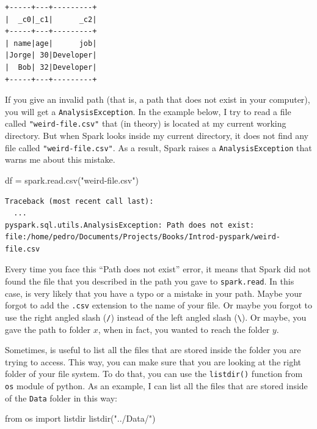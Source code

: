 \documentclass[
  11pt,
  letterpaper,
  DIV=11,
  numbers=noendperiod]{scrreprt}
\newenvironment{Shaded}{\begin{snugshade}}{\end{snugshade}}
\newcommand{\ImportTok}[1]{\textcolor[rgb]{0.00,0.46,0.62}{#1}}
\newcommand{\NormalTok}[1]{\textcolor[rgb]{0.00,0.23,0.31}{#1}}
\newcommand{\OperatorTok}[1]{\textcolor[rgb]{0.37,0.37,0.37}{#1}}
\newcommand{\StringTok}[1]{\textcolor[rgb]{0.13,0.47,0.30}{#1}}
\begin{document}
\begin{verbatim}
+-----+---+---------+
|  _c0|_c1|      _c2|
+-----+---+---------+
| name|age|      job|
|Jorge| 30|Developer|
|  Bob| 32|Developer|
+-----+---+---------+
\end{verbatim}

If you give an invalid path (that is, a path that does not exist in your
computer), you will get a \texttt{AnalysisException}. In the example
below, I try to read a file called \texttt{"weird-file.csv"} that (in
theory) is located at my current working directory. But when Spark looks
inside my current directory, it does not find any file called
\texttt{"weird-file.csv"}. As a result, Spark raises a
\texttt{AnalysisException} that warns me about this mistake.

\begin{Shaded}
\begin{Highlighting}[]
\NormalTok{df }\OperatorTok{=}\NormalTok{ spark.read.csv(}\StringTok{"weird{-}file.csv"}\NormalTok{)}
\end{Highlighting}
\end{Shaded}

\begin{verbatim}
Traceback (most recent call last):
  ...
pyspark.sql.utils.AnalysisException: Path does not exist: file:/home/pedro/Documents/Projects/Books/Introd-pyspark/weird-file.csv
\end{verbatim}

Every time you face this ``Path does not exist'' error, it means that
Spark did not found the file that you described in the path you gave to
\texttt{spark.read}. In this case, is very likely that you have a typo
or a mistake in your path. Maybe your forgot to add the \texttt{.csv}
extension to the name of your file. Or maybe you forgot to use the right
angled slash (\texttt{/}) instead of the left angled slash
(\texttt{\textbackslash{}}). Or maybe, you gave the path to folder
\(x\), when in fact, you wanted to reach the folder \(y\).

Sometimes, is useful to list all the files that are stored inside the
folder you are trying to access. This way, you can make sure that you
are looking at the right folder of your file system. To do that, you can
use the \texttt{listdir()} function from \texttt{os} module of python.
As an example, I can list all the files that are stored inside of the
\texttt{Data} folder in this way:

\begin{Shaded}
\begin{Highlighting}[]
\ImportTok{from}\NormalTok{ os }\ImportTok{import}\NormalTok{ listdir}
\NormalTok{listdir(}\StringTok{"../Data/"}\NormalTok{)}
\end{Highlighting}
\end{Shaded}
\end{document}
